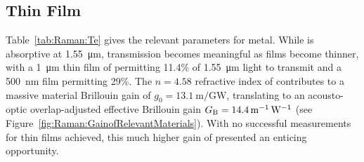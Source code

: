 \subsection{\texorpdfstring{}{Te} Thin Film}
\label{subsec:Raman:Target:Te}

Table~\ref{tab:Raman:Te} gives the relevant parameters for  metal. While  is absorptive at \SI{1.55}{\micro\meter}, transmission becomes meaningful as films become thinner, with a \SI{1}{\micro\meter} thin film of  permitting 11.4\% of \SI{1.55}{\micro\meter} light to transmit and a \SI{500}{\nano\meter} film permitting 29\%. \cite{ciesielski2018permittivity} The \(n = 4.58\) refractive index of  contributes to a massive material Brillouin gain of \(g_{0} = \SI{13.1}{\meter\per\giga\watt}\), translating to an acousto-optic overlap-adjusted effective Brillouin gain \(G_{\rm B} = \SI{14.4}{\per\meter\per\watt}\) (see Figure~\ref{fig:Raman:GainofRelevantMaterials}). With no successful measurements for  thin films achieved, this much higher gain of  presented an enticing opportunity.

